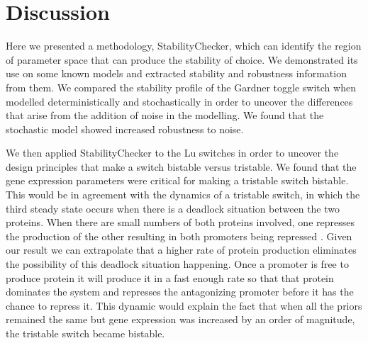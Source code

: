 \section{Discussion}

Here we presented a methodology, StabilityChecker, which can identify the region of parameter space that can produce the stability of choice. We demonstrated its use on some known models and extracted stability and robustness information from them. We compared the stability profile of the Gardner toggle switch when modelled deterministically and stochastically in order to uncover the differences that arise from the addition of noise in the modelling. We found that the stochastic model showed increased robustness to noise.

We then applied StabilityChecker to the Lu switches in order to uncover the design principles that make a switch bistable versus tristable. We found that the gene expression parameters were critical for making a tristable switch bistable. This would be in agreement with the dynamics of a tristable switch, in which the third steady state occurs when there is a deadlock situation between the two proteins. When there are small numbers of both proteins involved, one represses the production of the other resulting in both promoters being repressed \autocite{Ma:2012dt}. Given our result we can extrapolate that a higher rate of protein production eliminates the possibility of this deadlock situation happening. Once a promoter is free to produce protein it will produce it in a fast enough rate so that that protein dominates the system and represses the antagonizing promoter before it has the chance to repress it. This dynamic would explain the fact that when all the priors remained the same but gene expression was increased by an order of magnitude, the tristable switch became bistable. 

